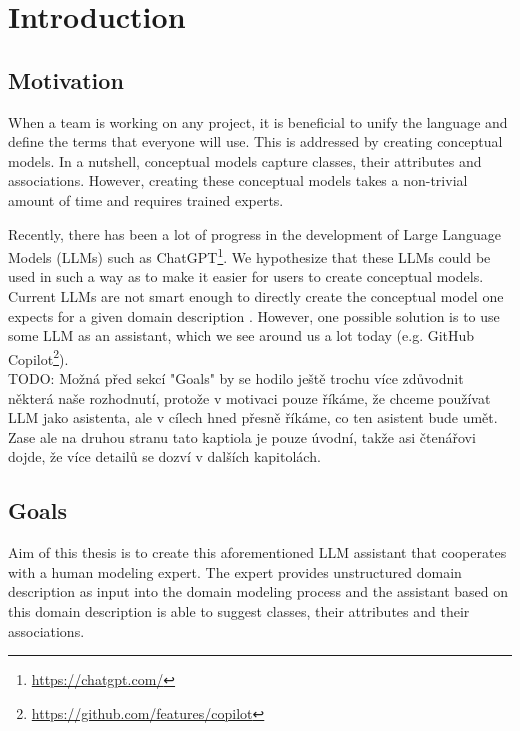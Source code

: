 \chapter*{Introduction}


\section*{Motivation}
When a team is working on any project, it is beneficial to unify the language and define the terms that everyone will use. This is addressed by creating conceptual models. In a nutshell, conceptual models capture classes, their attributes and associations. However, creating these conceptual models takes a non-trivial amount of time and requires trained experts.

Recently, there has been a lot of progress in the development of Large Language Models (LLMs) \cite{Zhao2023} such as ChatGPT\footnote{\url{https://chatgpt.com/}}. We hypothesize that these LLMs could be used in such a way as to make it easier for users to create conceptual models. Current LLMs are not smart enough to directly create the conceptual model one expects for a given domain description \cite{Chen2023}. However, one possible solution is to use some LLM as an assistant, which we see around us a lot today (e.g. GitHub Copilot\footnote{\url{https://github.com/features/copilot}}). \\


TODO: Možná před sekcí "Goals" by se hodilo ještě trochu více zdůvodnit některá naše rozhodnutí, protože v motivaci pouze říkáme, že chceme používat LLM jako asistenta, ale v cílech hned přesně říkáme, co ten asistent bude umět. Zase ale na druhou stranu tato kaptiola je pouze úvodní, takže asi čtenářovi dojde, že více detailů se dozví v dalších kapitolách. \\



\section*{Goals}
Aim of this thesis is to create this aforementioned LLM assistant that cooperates with a human modeling expert. The expert provides unstructured domain description as input into the domain modeling process and the assistant  based on this domain description is able to suggest classes, their attributes and their associations.

